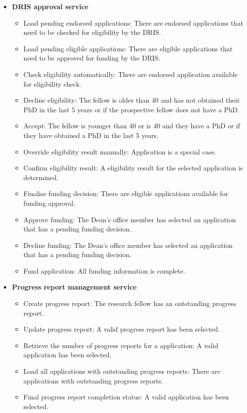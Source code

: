 \documentclass[12pt]{article}
\begin{document}
\begin{itemize}
	\item \textbf{DRIS approval service}
		\begin{itemize}
			\item Load pending endorsed applications: There are endorsed applications that need to be checked for eligibility by the DRIS.
			\item Load pending eligible applications: There are eligible applications that need to be approved for funding by the DRIS.
			\item Check eligibility automatically: There are endorsed application available for  eligibility check.
			\item Decline eligibility: The fellow is older than 40 and has not obtained their PhD in the last 5 years or if the prospective fellow does not have a PhD.
			\item Accept: The fellow is younger than 40 or is 40 and they have a PhD or if they have obtained a PhD in the last 5 years.
			\item Override eligibility result manually: Application is a special case.
			\item Confirm eligibility result: A eligibility result for the selected application is determined. 
			\item Finalise funding decision: There are eligible applications available for  funding approval.			
			\item Approve funding: The Dean's office member has selected an application that has a pending funding decision.	
			\item Decline funding: The Dean's office member has selected an application that has a pending funding decision.
			\item Fund application: All funding information is complete.											
		\end{itemize}
	
	\item \textbf{Progress report management service}
		\begin{itemize}
			\item Create progress report: The research fellow has an outstanding progress report.
			\item Update progress report: A valid progress report has been selected.
			\item Retrieve the number of progress reports for a application: A valid application has been selected.
			\item Load all applications with outstanding progress reports: There are applications with outstanding progress reports.
			\item Final progress report completion status: A valid application has been selected.						
		\end{itemize}


\end{itemize}
\end{document}
